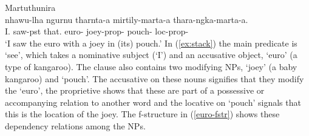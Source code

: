 \documentclass[output=paper,hidelinks]{langscibook}
\begin{document}

\ea \label{ex:stack}  Martuthunira \citep[60]{dench1995} \\
 {nhawu-lha} {ngurnu} {tharnta-a} {mirtily-marta-a} {thara-ngka-marta-a.}\\
{I.\NOM} {saw-{\sc pst}} {that.\ACC} {euro-\ACC}  {joey-{\sc prop}-\ACC}  {pouch-{\sc
    loc}-{\sc prop}-\ACC} 
\\
\glt `I saw the euro with a joey in (its) pouch.' 
  \z
In  (\ref{ex:stack}) the main predicate is `see', which takes a nominative
subject (`I') and an accusative object, `euro' (a type of kangaroo).
The clause also contains two modifying NPs, `joey' (a baby kangaroo) and
`pouch'.   The accusative on these nouns signifies that they modify the \OBJ
`euro', the proprietive shows that these are part of a possessive or
accompanying relation to another word and the locative on `pouch' signals that
this is the location of the joey.  The f-structure in (\ref{euro-fstr})
shows these dependency relations among the NPs. 



\end{document}
